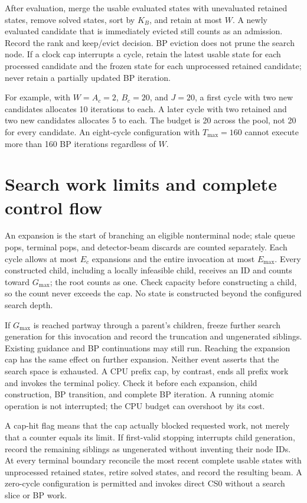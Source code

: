 \documentclass[11pt,a4paper]{article}
\begin{document}
After evaluation, merge the usable evaluated states with unevaluated retained states, remove solved states, sort by $K_B$, and retain at most $W$. A newly evaluated candidate that is immediately evicted still counts as an admission. Record the rank and keep/evict decision. BP eviction does not prune the search node. If a clock cap interrupts a cycle, retain the latest usable state for each processed candidate and the frozen state for each unprocessed retained candidate; never retain a partially updated BP iteration.

For example, with $W=A_c=2$, $B_c=20$, and $J=20$, a first cycle with two new candidates allocates 10 iterations to each. A later cycle with two retained and two new candidates allocates 5 to each. The budget is 20 across the pool, not 20 for every candidate. An eight-cycle configuration with $T_{\max}=160$ cannot execute more than 160 BP iterations regardless of $W$.

\section{Search work limits and complete control flow}
An expansion is the start of branching an eligible nonterminal node; stale queue pops, terminal pops, and detector-beam discards are counted separately. Each cycle allows at most $E_c$ expansions and the entire invocation at most $E_{\max}$. Every constructed child, including a locally infeasible child, receives an ID and counts toward $G_{\max}$; the root counts as one. Check capacity before constructing a child, so the count never exceeds the cap. No state is constructed beyond the configured search depth.

If $G_{\max}$ is reached partway through a parent's children, freeze further search generation for this invocation and record the truncation and ungenerated siblings. Existing guidance and BP continuations may still run. Reaching the expansion cap has the same effect on further expansion. Neither event asserts that the search space is exhausted. A CPU prefix cap, by contrast, ends all prefix work and invokes the terminal policy. Check it before each expansion, child construction, BP transition, and complete BP iteration. A running atomic operation is not interrupted; the CPU budget can overshoot by its cost.

A cap-hit flag means that the cap actually blocked requested work, not merely that a counter equals its limit. If first-valid stopping interrupts child generation, record the remaining siblings as ungenerated without inventing their node IDs. At every terminal boundary reconcile the most recent complete usable states with unprocessed retained states, retire solved states, and record the resulting beam. A zero-cycle configuration is permitted and invokes direct CS0 without a search slice or BP work.
\end{document}

